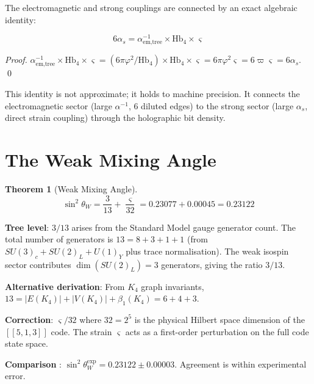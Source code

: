 \documentclass[11pt,a4paper]{article}
\newtheorem{theorem}{Theorem}[section]
\theoremstyle{definition}
\newcommand{\Hbfour}{\mathrm{Hb}_4}
\newcommand{\gs}{\varsigma}
\begin{document}
The electromagnetic and strong couplings are connected by an exact algebraic identity:

\begin{equation}
\boxed{6\alpha_s = \alpha^{-1}_{\text{em,tree}} \times \Hbfour \times \gs}
\label{eq:em_strong_id}
\end{equation}

\begin{proof}
$\alpha^{-1}_{\text{em,tree}} \times \Hbfour \times \gs = (6\pi\varphi^2/\Hbfour) \times \Hbfour \times \gs = 6\pi\varphi^2\gs = 6\varpi\gs = 6\alpha_s$. \qed
\end{proof}

This identity is not approximate; it holds to machine precision. It connects the electromagnetic sector (large $\alpha^{-1}$, 6 diluted edges) to the strong sector (large $\alpha_s$, direct strain coupling) through the holographic bit density.

\section{The Weak Mixing Angle}
\label{sec:sin2theta}

\begin{theorem}[Weak Mixing Angle]
\label{thm:sin2theta}
\begin{equation}
\sin^2\theta_W = \frac{3}{13} + \frac{\gs}{32} = 0.23077 + 0.00045 = 0.23122
\label{eq:sin2theta}
\end{equation}
\end{theorem}

\textbf{Tree level}: $3/13$ arises from the Standard Model gauge generator count. The total number of generators is $13 = 8 + 3 + 1 + 1$ (from $SU(3)_c + SU(2)_L + U(1)_Y$ plus trace normalisation). The weak isospin sector contributes $\dim(SU(2)_L) = 3$ generators, giving the ratio $3/13$.

\textbf{Alternative derivation}: From $K_4$ graph invariants, $13 = |E(K_4)| + |V(K_4)| + \beta_1(K_4) = 6 + 4 + 3$.

\textbf{Correction}: $\gs/32$ where $32 = 2^5$ is the physical Hilbert space dimension of the $[[5,1,3]]$ code. The strain $\gs$ acts as a first-order perturbation on the full code state space.

\textbf{Comparison} \cite{PDG2022}: $\sin^2\theta_W^{\text{exp}} = 0.23122 \pm 0.00003$. Agreement is within experimental error.
\end{document}
